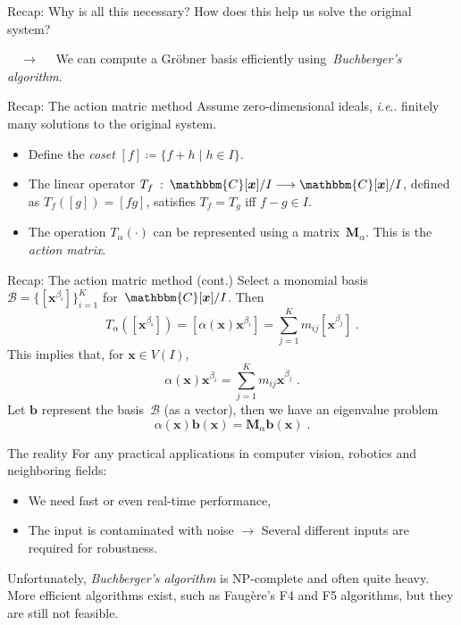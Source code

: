 \documentclass[aspectratio=169]{beamer}
\makeatletter
\newcommand{\C}{\ensuremath{\mathbbm{C}}}
\newcommand{\mat}[1]{\bm{#1}}
\DeclareRobustCommand\ie{\emph{i.e}\@ifnextchar.{}{.\@}}
\makeatother
\begin{document}
\begin{frame}{Recap: Why is all this necessary?}
How does this help us solve the original system?

$\quad\longrightarrow\quad$ We can compute a Gröbner basis efficiently using~\emph{Buchberger's algorithm}.
\end{frame}

\begin{frame}{Recap: The action matric method}
Assume zero-dimensional ideals, \ie{} finitely many solutions to the original system.
\begin{itemize}
\item Define the \emph{coset} $[f] \coloneqq \{f+h\;|\;h\in I\}$.
\item The linear operator $T_f\::\:\C[\mat{x}]/I\longrightarrow\C[\mat{x}]/I$, defined as $T_f([g])=[fg]$,
satisfies $T_f=T_g$ iff $f-g\in I$.
\item The operation $T_\alpha(\cdot)$ can be
represented using a matrix~$\mat{M}_\alpha$. This is the \emph{action matrix}.
\end{itemize}
\end{frame}

\begin{frame}{Recap: The action matric method (cont.)}
Select a monomial basis $\mathcal{B}=\{[\mat{x}^{\beta_i}]\}_{i=1}^K$ for~$\C[\mat{x}] / I$.
Then
\begin{equation*}
    T_\alpha([\mat{x}^{\beta_i}]) = [\alpha(\mat{x})\mat{x}^{\beta_i}] = \sum_{j=1}^Km_{ij}[\mat{x}^{\beta_j}]\;.
\end{equation*}
This implies that, for $\mat{x}\in V(I)$,
\begin{equation*}\label{kappa:eq:action}
    \alpha(\mat{x})\mat{x}^{\beta_i}=\sum_{j=1}^Km_{ij}\mat{x}^{\beta_j}\;.
\end{equation*}
Let $\mat{b}$ represent the basis~$\mathcal{B}$ (as a vector), then we have an \alert{eigenvalue problem}
\begin{equation*}\label{eq:actionmat}
    \alpha(\mat{x})\mat{b}(\mat{x}) = \mat{M}_\alpha\mat{b}(\mat{x})\;.
\end{equation*}
\end{frame}

\begin{frame}{The reality}
For any practical applications in computer vision, robotics and neighboring fields:
\begin{itemize}
\item We need fast or even real-time performance,
\item The input is contaminated with noise $\longrightarrow$ Several different inputs are
required for robustness.
\end{itemize}

Unfortunately, \emph{Buchberger's algorithm} is NP-complete and often quite heavy. More
efficient algorithms exist, such as Faugère's F4 and F5 algorithms, but they are
still not feasible.
\end{frame}
\end{document}
